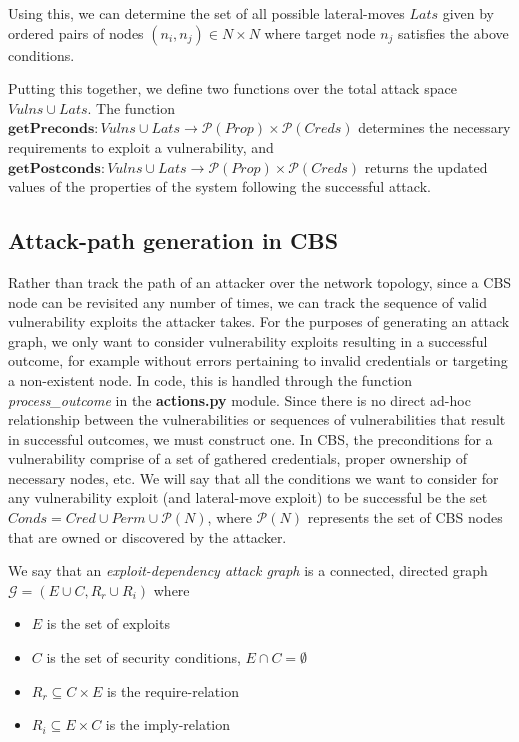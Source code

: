 Using this, we can determine the set of all possible lateral-moves $Lats$ given by ordered pairs of nodes $(n_{i}, n_{j}) \in N \times N$ where target node $n_{j}$ satisfies the above conditions.

Putting this together, we define two functions over the total attack space $Vulns \cup Lats$. The function $\mathbf{getPreconds}: Vulns \cup Lats \rightarrow \mathcal{P}(Prop) \times \mathcal{P}(Creds)$ determines the necessary requirements to exploit a vulnerability, and $\mathbf{getPostconds}: Vulns \cup Lats \rightarrow \mathcal{P}(Prop) \times \mathcal{P}(Creds)$ returns the updated values of the properties of the system following the successful attack.
\subsection{Attack-path generation in CBS}

Rather than track the path of an attacker over the network topology, since a CBS node can be revisited any number of times, we can track the sequence of valid vulnerability exploits the attacker takes. For the purposes of generating an attack graph, we only want to consider vulnerability exploits resulting in a successful outcome, for example without errors pertaining to invalid credentials or targeting a non-existent node. In code, this is handled through the function \textit{process\_outcome} in the \textbf{actions.py} module. Since there is no direct ad-hoc relationship between the vulnerabilities or sequences of vulnerabilities that result in successful outcomes, we must construct one. In CBS, the preconditions for a vulnerability comprise of a set of gathered credentials, proper ownership of necessary nodes, etc. We will say that all the conditions we want to consider for any vulnerability exploit (and lateral-move exploit) to be successful be the set $Conds = Cred \cup Perm \cup \mathcal{P}(N)$, where $\mathcal{P}(N)$ represents the set of CBS nodes that are owned or discovered by the attacker.

\begin{definition}
    We say that an \textit{exploit-dependency attack graph} is a connected, directed graph $\mathcal{G} = (E \cup C, R_{r} \cup R_{i})$ where
    \begin{itemize}
        \item $E$ is the set of exploits
        \item $C$ is the set of security conditions, $E \cap C = \emptyset$
        \item $R_{r} \subseteq C \times E$ is the require-relation
        \item $R_{i} \subseteq E \times C$ is the imply-relation
    \end{itemize}
\end{definition}

